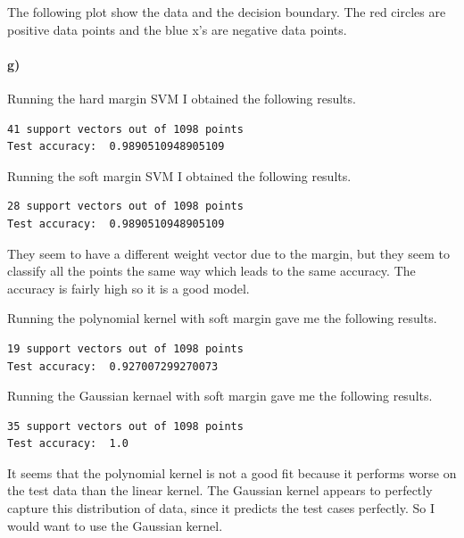 \documentclass[12pt]{article}
\begin{document}
The following plot show the data and the decision boundary. The red circles are positive data points and the blue x's are negative data points.
\begin{center}
\end{center}

\paragraph{g)}

Running the hard margin SVM I obtained the following results.
\begin{verbatim}
41 support vectors out of 1098 points
Test accuracy:  0.9890510948905109
\end{verbatim}
Running the soft margin SVM I obtained the following results.
\begin{verbatim}
28 support vectors out of 1098 points
Test accuracy:  0.9890510948905109
\end{verbatim}
They seem to have a different weight vector due to the margin, but they seem to classify
all the points the same way which leads to the same accuracy. The accuracy is fairly high so
it is a good model.

Running the polynomial kernel with soft margin gave me the following results.
\begin{verbatim}
19 support vectors out of 1098 points
Test accuracy:  0.927007299270073
\end{verbatim}
Running the Gaussian kernael with soft margin gave me the following results.
\begin{verbatim}
35 support vectors out of 1098 points
Test accuracy:  1.0
\end{verbatim}
It seems that the polynomial kernel is not a good fit because it performs worse on the
test data than the linear kernel. The Gaussian kernel appears to perfectly capture this
distribution of data, since it predicts the test cases perfectly. So I would want to use the
Gaussian kernel.
\end{document}
